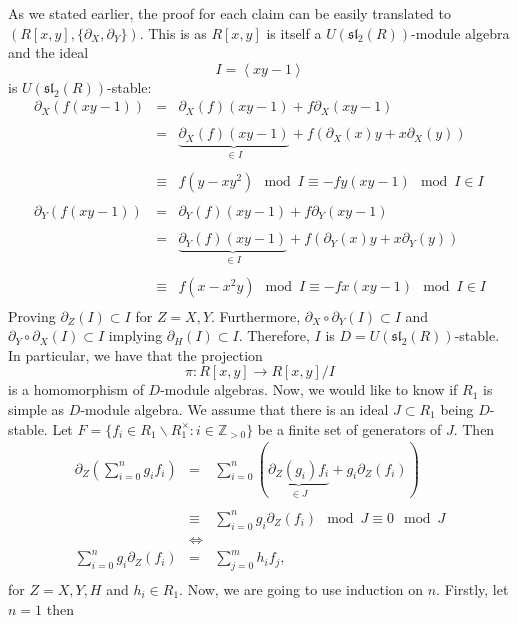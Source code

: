 \documentclass[10pt,a4paper]{article}
\begin{document}
As we stated earlier, the proof for each claim can be easily translated to $\left(R[x,y], \{\partial_X,\partial_Y\}\right)$. This is as $R[x,y]$ is itself a $U(\mathfrak{sl}_2(R))$-module algebra and the ideal
$$I = \left<x y - 1 \right>$$
is $U(\mathfrak{sl}_2(R))$-stable:
$$\begin{array}{rcl}
\partial_X(f (x y - 1)) &=& \partial_X(f) (x y - 1) + f \partial_X(x y - 1)\\
&&\\
&=& \underbrace{\partial_X(f) (x y - 1)}_{\in I} + f (\partial_X(x) y + x \partial_X(y))\\
&&\\
&\equiv& f (y - x y^2) \mod I \equiv -f y (x y - 1) \mod I \in I\\
&&\\
\partial_Y(f (x y - 1)) &=& \partial_Y(f) (x y - 1) + f \partial_Y(x y - 1)\\
&&\\
&=& \underbrace{\partial_Y(f) (x y - 1)}_{\in I} + f (\partial_Y(x) y + x \partial_Y(y))\\
&&\\
&\equiv& f (x - x^2 y) \mod I \equiv -f x (x y - 1) \mod I \in I\\
\end{array}$$
Proving $\partial_Z(I) \subset I$ for $Z = X, Y$. Furthermore, $\partial_X \circ \partial_Y (I) \subset I$ and $\partial_Y \circ \partial_X(I) \subset I$ implying $\partial_H(I) \subset I$. Therefore, $I$ is $D = U(\mathfrak{sl}_2(R))$-stable. In particular, we have that the projection
$$\pi : R[x,y] \longrightarrow R[x,y]/I$$
is a homomorphism of $D$-module algebras. Now, we would like to know if $R_1$ is simple as $D$-module algebra. We assume that there is an ideal $J \subset R_1$ being $D$-stable. Let $F = \{f_i \in R_1\backslash R_1^\times : i \in \mathbb{Z}_{>0}\}$ be a finite set of generators of $J$. Then
$$\begin{array}{rcl}
\partial_Z\left(\sum_{i=0}^n g_i f_i\right) &=& \sum_{i=0}^n \left(\underbrace{\partial_Z(g_i) f_i}_{\in J} + g_i \partial_Z(f_i)\right)\\
&&\\
&\equiv& \sum_{i=0}^n g_i \partial_Z(f_i) \mod J \equiv 0 \mod J\\
&\Leftrightarrow&\\
\sum_{i=0}^n g_i \partial_Z(f_i) &=& \sum_{j=0}^m h_i f_j,\\
\end{array}$$
for $Z = X, Y, H$ and $h_i \in R_1$. Now, we are going to use induction on $n$. Firstly, let $n = 1$ then
\end{document}
